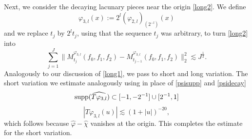\documentclass[12pt,reqno]{amsart}
\theoremstyle{plain}
\theoremstyle{definition}
\numberwithin{equation}{section}
\begin{document}
 Next, we consider the decaying lacunary pieces near the origin \eqref{long2}. We define
 \[\varphi_{3,l}(x):= 2^{l}(\varphi_{2,l})_{(2^{-l})}(x)\] 
 and we replace $t_j$ by $2^l t_j$, using that the sequence $t_j$ was arbitrary,
 to turn \eqref{long2} into
  \begin{equation}
      \label{long3}
      \sum_{j=1}^{J} \|M^{{\varphi_{3,l}}}_{t_j}(f_0,f_1,f_2) - M^{{\varphi_{3,l}}}_{t_{j-1}}(f_0,f_1,f_2)\|_{2}^2  \lesssim  J^{\frac 12}.
  \end{equation} 
 Analogously to our discussion of \eqref{long1}, we pass to short and long variation.
 The short variation we estimate analogously using in place of \eqref{psisupp}
 and \eqref{psidecay}  
 \begin{equation}\label{varphisupp}
    {\rm supp}(\widehat{T\varphi_{3,l}})\subset    [-1,-2^{-1}]\cup[2^{-1},1]
\end{equation}
\begin{equation}
    \label{varphidecay}
    |T\varphi_{3,l}(u)| \lesssim  (1+|u|)^{-20}, 
\end{equation}
which follows because  $\widehat{\varphi}-\widehat{\chi}$ vanishes at the origin.
This completes the estimate for the short variation.
\end{document}

